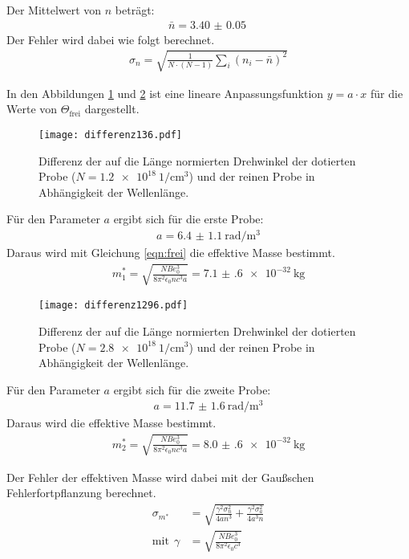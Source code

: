 Der Mittelwert von $n$ beträgt:
\begin{align*}
  \bar{n} = \SI{3.40(5)}{}
\end{align*}
Der Fehler wird dabei wie folgt berechnet.
\begin{align*}
  \sigma_n = \sqrt{\frac{1}{N\cdot(N-1)} \sum_i (n_i - \bar{n})^2}
\end{align*}

In den Abbildungen \ref{fig:differenz136} und \ref{fig:differenz1296} ist eine lineare
Anpassungsfunktion $y=a \cdot x$ für die Werte von $\Theta_{\mathrm{frei}}$ dargestellt.

\begin{figure}[H]
  \centering
  \texttt{[image: differenz136.pdf]}
  \caption{Differenz der auf die Länge normierten Drehwinkel der dotierten Probe ($N = \SI{1.2e18}{1\per\centi\meter^3}$) und der reinen Probe in Abhängigkeit der Wellenlänge.}
  \label{fig:differenz136}
\end{figure}

Für den Parameter $a$ ergibt sich für die erste Probe:
\begin{align*}
  a = \SI{6.4(11)}{\radian\per\meter^3}
\end{align*}
Daraus wird mit Gleichung \ref{eqn:frei} die effektive Masse bestimmt.
\begin{align*}
  m^*_1 = \sqrt{\frac{NB e^3_0}{8 \pi^2 \epsilon_0 n c^3 a}} = \SI{7.1(6)e-32}{\kilo\gram}
\end{align*}


\begin{figure}[H]
  \centering
  \texttt{[image: differenz1296.pdf]}
  \caption{Differenz der auf die Länge normierten Drehwinkel der dotierten Probe ($N = \SI{2.8e18}{1\per\centi\meter^3}$) und der reinen Probe in Abhängigkeit der Wellenlänge.}
  \label{fig:differenz1296}
\end{figure}


Für den Parameter $a$ ergibt sich für die zweite Probe:
\begin{align*}
  a = \SI{11.7(16)}{\radian\per\meter^3}
\end{align*}
Daraus wird die effektive Masse bestimmt.
\begin{align*}
  m^*_2 = \sqrt{\frac{NB e^3_0}{8 \pi^2 \epsilon_0 n c^3 a}} = \SI{8.0(6)e-32}{\kilo\gram}
\end{align*}


Der Fehler der effektiven Masse wird dabei mit der Gaußschen Fehlerfortpflanzung berechnet.
\begin{align*}
  \sigma_{m^*} &= \sqrt{\frac{\gamma^{2} \sigma_{n}^{2}}{4 a n^{3}}  + \frac{\gamma^{2} \sigma_{a}^{2}}{4 a^{3} n}} \\
  \text{mit}\:\: \gamma &= \sqrt{\frac{NB e^3_0}{8 \pi^2 \epsilon_0 c^3}}
\end{align*}
